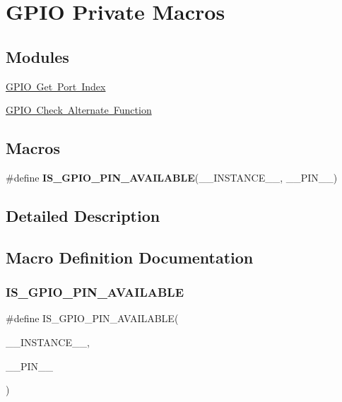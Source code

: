 \hypertarget{group___g_p_i_o_ex___private___macros}{}\section{G\+P\+IO Private Macros}
\label{group___g_p_i_o_ex___private___macros}
\subsection*{Modules}
\begin{DoxyCompactItemize}
\item 
\mbox{\hyperlink{group___g_p_i_o_ex___get___port___index}{G\+P\+I\+O Get Port Index}}
\item 
\mbox{\hyperlink{group___g_p_i_o_ex___i_s___alternat__function__selection}{G\+P\+I\+O Check Alternate Function}}
\end{DoxyCompactItemize}
\subsection*{Macros}
\begin{DoxyCompactItemize}
\item 
\#define {\bfseries I\+S\+\_\+\+G\+P\+I\+O\+\_\+\+P\+I\+N\+\_\+\+A\+V\+A\+I\+L\+A\+B\+LE}(\+\_\+\+\_\+\+I\+N\+S\+T\+A\+N\+C\+E\+\_\+\+\_\+,  \+\_\+\+\_\+\+P\+I\+N\+\_\+\+\_\+)
\end{DoxyCompactItemize}


\subsection{Detailed Description}


\subsection{Macro Definition Documentation}
\mbox{\label{group___g_p_i_o_ex___private___macros_ga747058eda6b3028f40094970d3ffe819}} 
\subsubsection{\texorpdfstring{IS\_GPIO\_PIN\_AVAILABLE}{IS\_GPIO\_PIN\_AVAILABLE}}
{\footnotesize\ttfamily \#define I\+S\+\_\+\+G\+P\+I\+O\+\_\+\+P\+I\+N\+\_\+\+A\+V\+A\+I\+L\+A\+B\+LE(\begin{DoxyParamCaption}\item[{}]{\+\_\+\+\_\+\+I\+N\+S\+T\+A\+N\+C\+E\+\_\+\+\_\+,  }\item[{}]{\+\_\+\+\_\+\+P\+I\+N\+\_\+\+\_\+ }\end{DoxyParamCaption})}

